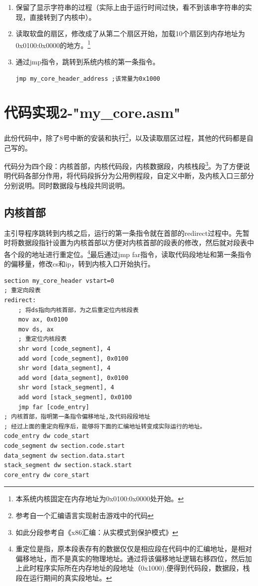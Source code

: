 \documentclass[forprint]{WHUBachelor}
\begin{document}
\begin{enumerate}
  \item 保留了显示字符串的过程（实际上由于运行时间过快，看不到该串字符串的实现，直接转到了内核中）。
  \item 读取软盘的扇区，修改成了从第二个扇区开始，加载10个扇区到内存地址为0x0100:0x0000的地方。\footnote{本系统内核固定在内存地址为0x0100:0x0000处开始。}
  \item 通过jmp指令，跳转到系统内核的第一条指令。
  \begin{lstlisting}[language={[x86masm]Assembler}]
    jmp my_core_header_address ;该常量为0x1000
  \end{lstlisting}
\end{enumerate}

\section{代码实现2-"my\_core.asm"}
此份代码中，除了8号中断的安装和执行\footnote{参考自一个汇编语言实现射击游戏中的代码\cite{hit_plane}}，以及读取扇区过程\cite{read_sector}，其他的代码都是自己写的。 

代码分为四个段：内核首部，内核代码段，内核数据段，内核栈段\footnote{如此分段参考自《x86汇编：从实模式到保护模式》\cite{2013x86汇编语言从实模式到保护模式}}。为了方便说明代码各部分作用，将代码段拆分为公用例程段，自定义中断，及内核入口三部分分别说明。同时数据段与栈段共同说明。

\subsection{内核首部}
主引导程序跳转到内核之后，运行的第一条指令就在首部的redirect过程中。先暂时将数据段指针设置为内核首部以方便对内核首部的段表的修改，然后就对段表中各个段的地址进行重定位。\footnote{重定位是指，原本段表存有的数据仅仅是相应段在代码中的汇编地址，是相对偏移地址，而不是真实的物理地址。通过将该偏移地址逻辑右移四位，然后加上此时程序实际所在内存地址的段地址（0x1000),便得到代码段，数据段，栈段在运行期间的真实段地址。}最后通过jmp far指令，读取代码段地址和第一条指令的偏移量，修改cs和ip，转到内核入口开始执行。
\begin{lstlisting}[language={[x86masm]Assembler}]
section my_core_header vstart=0
; 重定向段表
redirect:
    ; 将ds指向内核首部，为之后重定位内核段表
    mov ax, 0x0100
    mov ds, ax
    ; 重定位内核段表
    shr word [code_segment], 4
    add word [code_segment], 0x0100
    shr word [data_segment], 4
    add word [data_segment], 0x0100
    shr word [stack_segment], 4
    add word [stack_segment], 0x0100
    jmp far [code_entry]
; 内核首部，指明第一条指令偏移地址,及代码段段地址
; 经过上面的重定向程序后，能够将下面的汇编地址转变成实际运行的地址。
code_entry dw code_start
code_segment dw section.code.start
data_segment dw section.data.start
stack_segment dw section.stack.start
core_entry dw core_start
\end{lstlisting}
\end{document}
